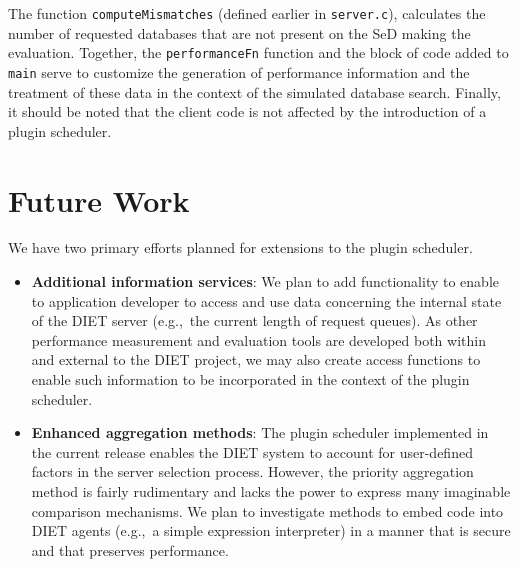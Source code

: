 The function \texttt{computeMismatches} (defined earlier in
\texttt{server.c}), calculates the number of requested databases that
are not present on the SeD making the evaluation.
Together, the \texttt{performanceFn} function and the block of code
added to \texttt{main} serve to customize the generation of
performance information and the treatment of these data in the context
of the simulated database search.
Finally, it should be noted that the client code is not affected by
the introduction of a plugin scheduler.

\section{Future Work}

We have two primary efforts planned for extensions to the plugin
scheduler.
\begin{itemize}
\item \textbf{Additional information services}: We plan to add
  functionality to enable to application developer to access and use
  data concerning the internal state of the DIET server (e.g.,~the
  current length of request queues).  As other performance measurement
  and evaluation tools are developed both within and external to the
  DIET project, we may also create access functions to enable such
  information to be incorporated in the context of the plugin
  scheduler.
\item \textbf{Enhanced aggregation methods}: The plugin scheduler
  implemented in the current release enables the DIET system to
  account for user-defined factors in the server selection process.
  However, the priority aggregation method is fairly rudimentary and
  lacks the power to express many imaginable comparison mechanisms.
  We plan to investigate methods to embed code into DIET agents
  (e.g.,~a simple expression interpreter) in a manner that is secure
  and that preserves performance.
\end{itemize}

